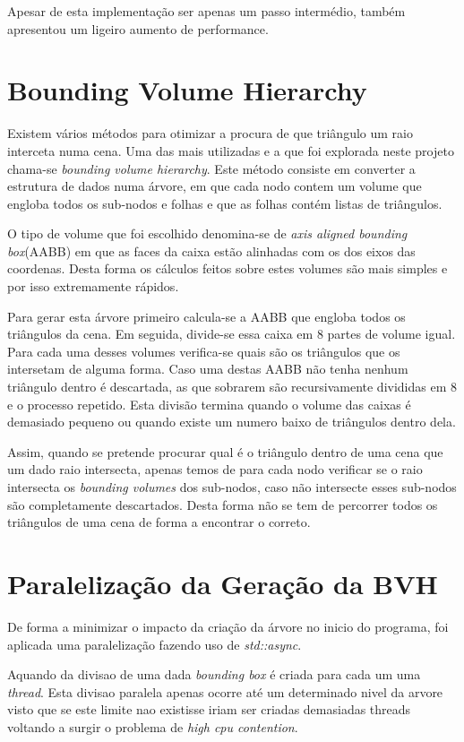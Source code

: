 \documentclass[a4paper]{report}
\begin{document}
Apesar de esta implementação ser apenas um passo intermédio, também apresentou
um ligeiro aumento de performance.

\section{Bounding Volume Hierarchy}

Existem vários métodos para otimizar a procura de que triângulo um raio
interceta numa cena. Uma das mais utilizadas e a que foi explorada neste projeto
chama-se \textit{bounding volume hierarchy}. Este método consiste em converter a
estrutura de dados numa árvore, em que cada nodo contem um volume que engloba
todos os sub-nodos e folhas e que as folhas contém listas de triângulos.

O tipo de volume que foi escolhido denomina-se de \textit{axis aligned bounding
box}(AABB) em que as faces da caixa estão alinhadas com os dos eixos das coordenas.
Desta forma os cálculos feitos sobre estes volumes são mais simples e por isso
extremamente rápidos.

Para gerar esta árvore primeiro calcula-se a AABB que engloba todos os
triângulos da cena. Em seguida, divide-se essa caixa em 8 partes de volume
igual. Para cada uma desses volumes verifica-se quais são os triângulos que os
intersetam de alguma forma. Caso uma destas AABB não tenha nenhum triângulo
dentro é descartada, as que sobrarem são recursivamente divididas em 8 e o
processo repetido. Esta divisão termina quando o volume das caixas é demasiado
pequeno ou quando existe um numero baixo de triângulos dentro dela.

Assim, quando se pretende procurar qual é o triângulo dentro de uma cena que um
dado raio intersecta, apenas temos de para cada nodo verificar se o raio
intersecta os \textit{bounding volumes} dos sub-nodos, caso não intersecte esses
sub-nodos são completamente descartados. Desta forma não se tem de percorrer
todos os triângulos de uma cena de forma a encontrar o correto.

\section{Paralelização da Geração da BVH}

De forma a minimizar o impacto da criação da árvore no inicio do programa, foi
aplicada uma paralelização fazendo uso de \textit{std::async}.

Aquando da divisao de uma dada \textit{bounding box} é criada para cada um uma
\textit{thread}. Esta divisao paralela apenas ocorre até um determinado nivel da
arvore visto que se este limite nao existisse iriam ser criadas demasiadas
threads voltando a surgir o problema de \textit{high cpu contention}.
\end{document}
